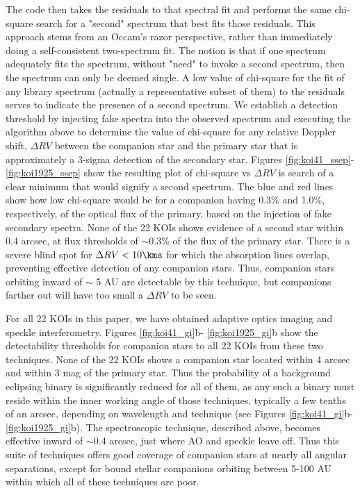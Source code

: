 \documentclass{emulateapj}
\begin{document}
The code then takes the residuals to that spectral fit and performs
 the same chi-square search for a "second" spectrum that best fits
 those residuals.  This approach stems from an Occam's razor
 perspective, rather than immediately doing a self-consistent
 two-spectrum fit.  The notion is that if one spectrum adequately fits
 the spectrum, without "need" to invoke a second spectrum, then the
 spectrum can only be deemed single.  A low value of chi-square for
 the fit of any library spectrum (actually a representative subset of
 them) to the residuals serves to indicate the presence of a second
 spectrum.  We establish a detection threshold by injecting fake
 spectra into the observed spectrum and executing the algorithm above
 to determine the value of chi-square for any relative Doppler shift,
 $\Delta RV$ between the companion star and the primary star that is
 approximately a 3-sigma detection of the secondary star.  Figures
\ref{fig:koi41_ssep}- \ref{fig:koi1925_ssep} show the resulting plot of 
chi-square vs $\Delta RV$ is search
 of a clear minimum that would signify a second spectrum.  The blue
 and red lines show how low chi-square would be for a companion having
 0.3\% and 1.0\%, respectively, of the optical flux of the primary,
 based on the injection of fake secondary spectra.  None of the 22
 KOIs shows evidence of a second star within 0.4 arcsec, at flux
 thresholds of $\sim$0.3\% of the flux of the primary star.  There is
 a severe blind spot for $\Delta RV < 10 \kms$ for which the
 absorption lines overlap, preventing effective detection of any
 companion stars.  Thus, companion stars orbiting inward of $\sim$ 5
 AU are detectable by this technique, but companions farther out will
 have too small a $\Delta RV$ to be seen.
 
For all 22 KOIs in this paper, we have obtained adaptive optics
 imaging and speckle interferometry.  Figures \ref{fig:koi41_gi}b-
 \ref{fig:koi1925_gi}b show the
 detectability thresholds for companion stars to all 22 KOIs from
 these two techniques.  None of the 22 KOIs shows a companion star
 located within 4 arcsec and within 3 mag of the primary star.  Thus
 the probability of a background eclipsing binary is significantly
 reduced for all of them, as any such a binary must reside within the
 inner working angle of those techniques, typically a few tenths of an
 arcsec, depending on wavelength and technique (see Figures \ref{fig:koi41_gi}b-
 \ref{fig:koi1925_gi}b).  %
  The spectroscopic technique, described above, becomes effective
 inward of $\sim$0.4 arcsec, just where AO and speckle leave off.
  Thus this suite of techniques offers good coverage of companion
 stars at nearly all angular separations, except for bound stellar
 companions orbiting between 5-100 AU within which all of these
 techniques are poor.
\end{document}
